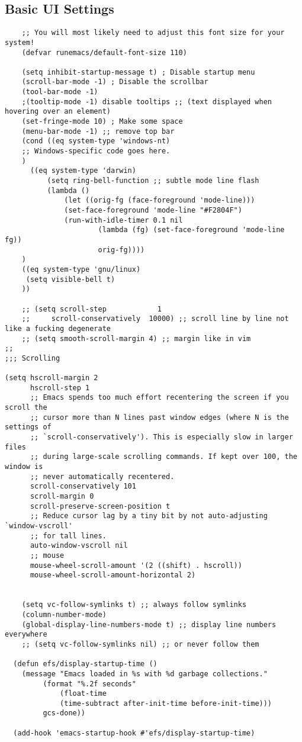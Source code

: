 \documentclass[11pt]{article}
\begin{document}
\subsection{Basic UI Settings}
\label{sec:orgf76ed69}
\begin{verbatim}
    ;; You will most likely need to adjust this font size for your system!
    (defvar runemacs/default-font-size 110)

    (setq inhibit-startup-message t) ; Disable startup menu
    (scroll-bar-mode -1) ; Disable the scrollbar
    (tool-bar-mode -1)
    ;(tooltip-mode -1) disable tooltips ;; (text displayed when hovering over an element)
    (set-fringe-mode 10) ; Make some space
    (menu-bar-mode -1) ;; remove top bar
    (cond ((eq system-type 'windows-nt)
	;; Windows-specific code goes here.
	)
	  ((eq system-type 'darwin)
	      (setq ring-bell-function ;; subtle mode line flash
		  (lambda ()
		      (let ((orig-fg (face-foreground 'mode-line)))
		      (set-face-foreground 'mode-line "#F2804F")
		      (run-with-idle-timer 0.1 nil
					  (lambda (fg) (set-face-foreground 'mode-line fg))
					  orig-fg))))
	)
	((eq system-type 'gnu/linux)
	 (setq visible-bell t)
	))

    ;; (setq scroll-step            1
    ;;     scroll-conservatively  10000) ;; scroll line by line not like a fucking degenerate
    ;; (setq smooth-scroll-margin 4) ;; margin like in vim
;;
;;; Scrolling

(setq hscroll-margin 2
      hscroll-step 1
      ;; Emacs spends too much effort recentering the screen if you scroll the
      ;; cursor more than N lines past window edges (where N is the settings of
      ;; `scroll-conservatively'). This is especially slow in larger files
      ;; during large-scale scrolling commands. If kept over 100, the window is
      ;; never automatically recentered.
      scroll-conservatively 101
      scroll-margin 0
      scroll-preserve-screen-position t
      ;; Reduce cursor lag by a tiny bit by not auto-adjusting `window-vscroll'
      ;; for tall lines.
      auto-window-vscroll nil
      ;; mouse
      mouse-wheel-scroll-amount '(2 ((shift) . hscroll))
      mouse-wheel-scroll-amount-horizontal 2)


    (setq vc-follow-symlinks t) ;; always follow symlinks
    (column-number-mode)
    (global-display-line-numbers-mode t) ;; display line numbers everywhere
    ;; (setq vc-follow-symlinks nil) ;; or never follow them

  (defun efs/display-startup-time ()
    (message "Emacs loaded in %s with %d garbage collections."
	     (format "%.2f seconds"
		     (float-time
		     (time-subtract after-init-time before-init-time)))
	     gcs-done))

  (add-hook 'emacs-startup-hook #'efs/display-startup-time)
\end{verbatim}
\end{document}
